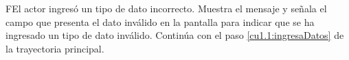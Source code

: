  \begin{UCtrayectoriaA}{F}{El actor ingresó un tipo de dato incorrecto.}
    \UCpaso[\UCsist] Muestra el mensaje  y señala el campo que presenta el dato inválido en la 
    pantalla  para indicar que se ha ingresado un tipo de dato inválido.
    \UCpaso[] Continúa con el paso \ref{cu1.1:ingresaDatos} de la trayectoria principal.
 \end{UCtrayectoriaA}
 